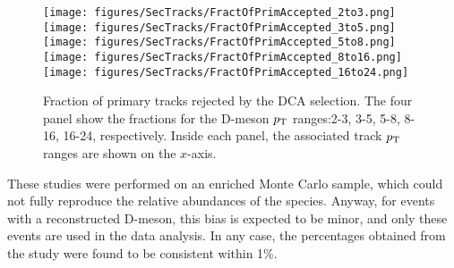 \begin{figure}[h]   %
	\centering
	\texttt{[image: figures/SecTracks/FractOfPrimAccepted\_2to3.png]}
	\texttt{[image: figures/SecTracks/FractOfPrimAccepted\_3to5.png]}
	\texttt{[image: figures/SecTracks/FractOfPrimAccepted\_5to8.png]}
    \texttt{[image: figures/SecTracks/FractOfPrimAccepted\_8to16.png]}
    \texttt{[image: figures/SecTracks/FractOfPrimAccepted\_16to24.png]}
	\caption{Fraction of primary tracks rejected by the DCA selection. The four panel show the fractions for the D-meson $p_{\rm T}$ ranges:2-3, 3-5, 5-8, 8-16, 16-24, respectively. Inside each panel, the associated track $p_{\rm T}$ ranges are shown on the $x$-axis.}
		\label{fig:primRej}	
\end{figure}

These studies were performed on an enriched Monte Carlo sample, which could not fully reproduce the relative abundances of the species. Anyway, for events with a reconstructed D-meson, this bias is expected to be minor, and only these events are used in the data analysis. In any case, the percentages obtained from the study were found to be consistent within 1\%.

\clearpage
%
